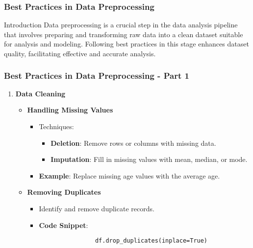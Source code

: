 \documentclass[aspectratio=169]{beamer}
\begin{document}
\begin{frame}
    \frametitle{Best Practices in Data Preprocessing}
    \begin{block}{Introduction}
        Data preprocessing is a crucial step in the data analysis pipeline that involves preparing and transforming raw data into a clean dataset suitable for analysis and modeling. Following best practices in this stage enhances dataset quality, facilitating effective and accurate analysis.
    \end{block}
\end{frame}

\begin{frame}[fragile]
    \frametitle{Best Practices in Data Preprocessing - Part 1}
    \begin{enumerate}
        \item \textbf{Data Cleaning}
        \begin{itemize}
            \item \textbf{Handling Missing Values}
            \begin{itemize}
                \item Techniques:
                \begin{itemize}
                    \item \textbf{Deletion}: Remove rows or columns with missing data.
                    \item \textbf{Imputation}: Fill in missing values with mean, median, or mode.
                \end{itemize}
                \item \textbf{Example}: Replace missing age values with the average age.
            \end{itemize}
            \item \textbf{Removing Duplicates}
            \begin{itemize}
                \item Identify and remove duplicate records.
                \item \textbf{Code Snippet}:
                \begin{lstlisting}
                df.drop_duplicates(inplace=True)
                \end{lstlisting}
            \end{itemize}
        \end{itemize}
    \end{enumerate}
\end{frame}
\end{document}
